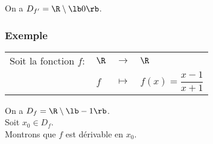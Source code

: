 \vspace*{.3cm}

On a $D_{f'} = \R \setminus \lb 0 \rb $.
 
\newpage

\vspace*{-2cm}

\subsubsection{Exemple }

\begin{tabular}{llll}
Soit la fonction $f :$ & $\R$ & $\longrightarrow$ & $\R$ \\
& $f$ & $\longmapsto$ & $f(x) = \dfrac{x-1}{x+1} $ \\
\end{tabular}

On a $D_f = \R \setminus \lb -1 \rb $. \\

Soit $x_0 \in D_f$. \\

Montrons que $f$ est dérivable en $x_0$. \\

